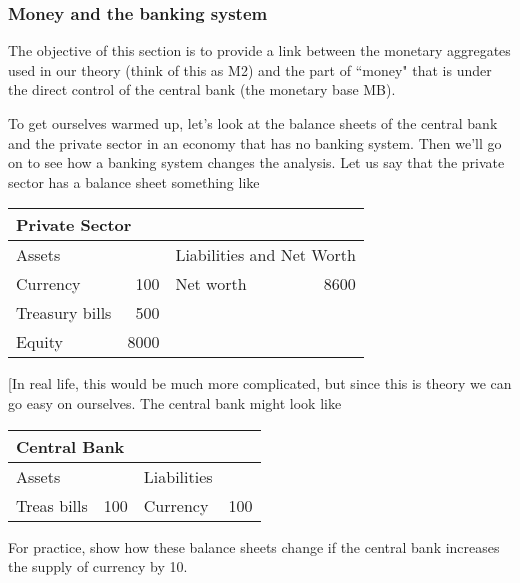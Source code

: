 \documentclass[letterpaper,12pt]{article}
\begin{document}
\subsubsection*{Money and the banking system}

The objective of this section is to provide a link
between the monetary aggregates used in our theory (think of this as M2) and the part of ``money" that is under the direct control of the
central bank (the monetary base MB).

To get ourselves warmed up,
let's look at the balance sheets of the central bank
and the private sector in an economy that has no banking system.
Then we'll go on to see how a banking system changes the
analysis.  Let us say that the private sector
has a balance sheet something like
%
\begin{center}
\begin{tabular}{lr|lr}
\multicolumn{4}{l}{Private Sector}     \\
\hline
            Assets                &&
            \multicolumn{2}{l}{Liabilities and Net Worth}   \\
\hline
            Currency        &   100   &   Net worth  &   8600          \\
            Treasury bills  &   500   &                                \\
            Equity          &  8000   &                                \\
\end{tabular}
\end{center}
%
[In real life, this would be much more complicated, but since this is theory we can go easy on
ourselves.
The central bank might look like
%
\begin{center}
\begin{tabular}{lr|lr}
\multicolumn{4}{l}{Central Bank}               \\
\hline
                    Assets      &&          Liabilities        \\
\hline
                    Treas bills & 100    &  Currency   &100    \\
\end{tabular}
\end{center}
%
For practice, show how these balance sheets change if the central
bank increases the supply of currency by 10.
\end{document}
